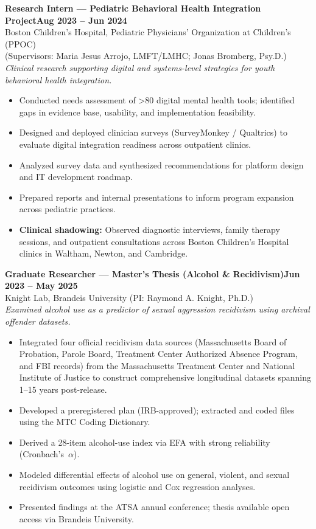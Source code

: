 \documentclass[10pt, letterpaper]{article}
\newenvironment{expitems}{
    \begin{itemize}[
        leftmargin=8pt,
        itemsep=1pt,
        topsep=2pt,
        parsep=0pt,
        partopsep=0pt
    ]
}{\end{itemize}}
\newcommand{\expheading}[2]{\noindent\textbf{#1}\hfill\textbf{#2}\\}
\newcommand{\expinfo}[1]{\noindent #1\\}
\newcommand{\expscope}[1]{\noindent\textit{#1}\\}
\begin{document}
\vspace{2pt}
\expheading{Research Intern — Pediatric Behavioral Health Integration Project}{Aug 2023 -- Jun 2024}
\expinfo{Boston Children's Hospital, Pediatric Physicians' Organization at Children's (PPOC) \\ (Supervisors: Maria Jesus Arrojo, LMFT/LMHC; Jonas Bromberg, Psy.D.)}
\vspace{3pt}
\expscope{\textit{Clinical research supporting digital and systems-level strategies for youth behavioral health integration.}}
\begin{expitems}
    \item Conducted needs assessment of >80 digital mental health tools; identified gaps in evidence base, usability, and implementation feasibility.
    \item Designed and deployed clinician surveys (SurveyMonkey / Qualtrics) to evaluate digital integration readiness across outpatient clinics.
    \item Analyzed survey data and synthesized recommendations for platform design and IT development roadmap.
    \item Prepared reports and internal presentations to inform program expansion across pediatric practices.
    \item \textbf{Clinical shadowing:} Observed diagnostic interviews, family therapy sessions, and outpatient consultations across Boston Children's Hospital clinics in Waltham, Newton, and Cambridge.
\end{expitems}
\vspace{2pt}
\expheading{Graduate Researcher — Master's Thesis (Alcohol \& Recidivism)}{Jun 2023 -- May 2025}
\expinfo{Knight Lab, Brandeis University (PI: Raymond A. Knight, Ph.D.)}
\vspace{3pt}
\expscope{Examined alcohol use as a predictor of sexual aggression recidivism using archival offender datasets.}
\begin{expitems}
    \item Integrated four official recidivism data sources (Massachusetts Board of Probation, Parole Board, Treatment Center Authorized Absence Program, and FBI records) from the Massachusetts Treatment Center and National Institute of Justice to construct comprehensive longitudinal datasets spanning 1–15 years post-release.
   \item Developed a preregistered plan (IRB-approved); extracted and coded files using the MTC Coding Dictionary.
  \item Derived a 28-item alcohol-use index via EFA with strong reliability (Cronbach’s~$\alpha$).
  \item Modeled differential effects of alcohol use on general, violent, and sexual recidivism outcomes using logistic and Cox regression analyses.
    \item Presented findings at the ATSA annual conference; thesis available open access via Brandeis University.
\end{expitems}
\end{document}
